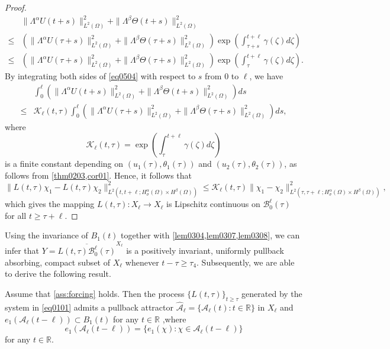 \documentclass[oneside,preprint,12pt,numbers,sort&compress]{elsarticle}
\begin{document}
\begin{proof}
\begin{equation}
\begin{aligned}
&\| \Lambda^{\alpha}U(t+s) \|_{L^2(\Omega)}^{2} + \| \Lambda^{\beta}\Theta (t+s) \|_{L^2(\Omega)}^{2} \\
\leq & \left( \| \Lambda^{\alpha}U(\tau+s) \|_{L^2(\Omega)}^{2} + \| \Lambda^{\beta}\Theta (\tau+s) \|_{L^2(\Omega)}^{2} \right) \exp \left( \int_{\tau+s}^{t+\ell} \gamma(\zeta) d\zeta \right) \\
\leq & \left( \| \Lambda^{\alpha}U(\tau+s) \|_{L^2(\Omega)}^{2} + \| \Lambda^{\beta}\Theta (\tau+s) \|_{L^2(\Omega)}^{2} \right) \exp \left( \int_{\tau}^{t+\ell} \gamma(\zeta) d\zeta \right).
\end{aligned}
\end{equation}
By integrating both sides of \cref{eq0504} with respect to $s$ from $0$ to $\ell$, we have
\begin{equation}\label{eq0320}    
\begin{aligned}
&\int_{0}^{\ell} 
\left( \| \Lambda^{\alpha}U(t+s) \|_{L^2(\Omega)}^{2} + \| \Lambda^{\beta}\Theta (t+s) \|_{L^2(\Omega)}^{2} \right)
 ds \\
\leq &  \mathcal{K}_{\ell}(t,\tau)
\int_{0}^{\ell} 
\left( \| \Lambda^{\alpha}U(\tau+s) \|_{L^2(\Omega)}^{2} + \| \Lambda^{\beta}\Theta (\tau+s) \|_{L^2(\Omega)}^{2} \right)ds,
\end{aligned}
\end{equation}
where
$$
\mathcal{K}_{\ell}(t,\tau)= \exp \left( \int_{\tau}^{t+\ell} \gamma(\zeta) d\zeta \right)
$$
is a finite constant depending on $(u_1(\tau), \theta_1(\tau))$ and $(u_2(\tau), \theta_2(\tau))$, as follows from \cref{thm0203,cor01}. Hence, it follows that 
$$
\| L(t, \tau)\chi_1 - L(t, \tau)\chi_2 \|_{L^2(t, t+\ell; H_\sigma^{\alpha}(\Omega) \times H^{\beta}(\Omega))}^2 
\leq \mathcal{K}_\ell(t, \tau) \| \chi_1 - \chi_2 \|_{L^2(\tau, \tau+\ell; H_\sigma^{\alpha}(\Omega) \times H^{\beta}(\Omega))}^2,
$$
which gives the mapping $L(t, \tau) : X_\ell \to X_\ell$ is Lipschitz continuous on $\mathcal{B}_0^\ell(\tau)$ for all $t \geq \tau + \ell$.
\end{proof}

Using the invariance of \(B_1(t)\) together with \cref{lem0304,lem0307,lem0308}, we can infer that \(Y = \overline{L(t, \tau) \mathcal{B}_0^\ell(\tau)}^{X_\ell}\) is a positively invariant, uniformly pullback absorbing, compact subset of \(X_\ell\) whenever \(t - \tau \geq \tau_{4}\). Subsequently, we are able to derive the following result. 

\begin{theorem}\label{lem0309}
Assume that \cref{ass:forcing} holds. Then the process \(\{L(t, \tau)\}_{t \geq\tau}\) generated by the system in \cref{eq0101} admits a pullback attractor \(\hat{\mathcal{A}}_{\ell}=\{\mathcal {A}_{\ell}(t): t \in \mathbb{R}\}\) in \(X_{\ell}\) and \(e_{1}(\mathcal {A}_{\ell}(t-\ell)) \subset B_{1}(t)\) for any \(t \in \mathbb{R}\) ,where 
\[
e_{1}(\mathcal {A}_{\ell }(t-\ell ))=\{ e_{1}(\chi ):\chi \in \mathcal {A}_{\ell }(t-\ell )\}
\]
for any \(t \in \mathbb{R}\).
\end{theorem}
\end{document}
